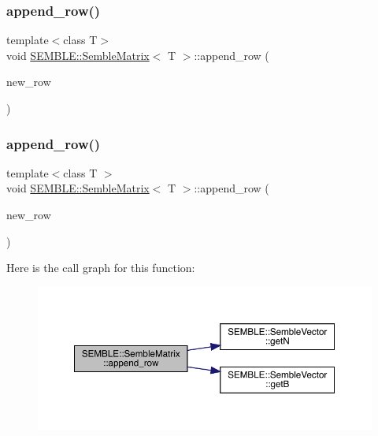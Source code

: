 \subsubsection{\texorpdfstring{append\_row()}{append\_row()}\hspace{0.1cm}{\footnotesize\ttfamily [1/4]}}
{\footnotesize\ttfamily template$<$class T$>$ \\
void \mbox{\hyperlink{structSEMBLE_1_1SembleMatrix}{S\+E\+M\+B\+L\+E\+::\+Semble\+Matrix}}$<$ T $>$\+::append\+\_\+row (\begin{DoxyParamCaption}\item[{const \mbox{\hyperlink{structSEMBLE_1_1SembleVector}{Semble\+Vector}}$<$ T $>$ \&}]{new\+\_\+row }\end{DoxyParamCaption})}

\mbox{\label{structSEMBLE_1_1SembleMatrix_a7553dc6264308f6f0755e46ed49c3df4}} 
\subsubsection{\texorpdfstring{append\_row()}{append\_row()}\hspace{0.1cm}{\footnotesize\ttfamily [2/4]}}
{\footnotesize\ttfamily template$<$class T $>$ \\
void \mbox{\hyperlink{structSEMBLE_1_1SembleMatrix}{S\+E\+M\+B\+L\+E\+::\+Semble\+Matrix}}$<$ T $>$\+::append\+\_\+row (\begin{DoxyParamCaption}\item[{const \mbox{\hyperlink{structSEMBLE_1_1SembleVector}{Semble\+Vector}}$<$ T $>$ \&}]{new\+\_\+row }\end{DoxyParamCaption})}

Here is the call graph for this function\+:
\nopagebreak
\begin{figure}[H]
\begin{center}
\leavevmode
\includegraphics[width=350pt]{df/d87/structSEMBLE_1_1SembleMatrix_a7553dc6264308f6f0755e46ed49c3df4_cgraph}
\end{center}
\end{figure}
\mbox{\label{structSEMBLE_1_1SembleMatrix_a823a02fc92f954965ca57bd5cbe72cfe}} 
